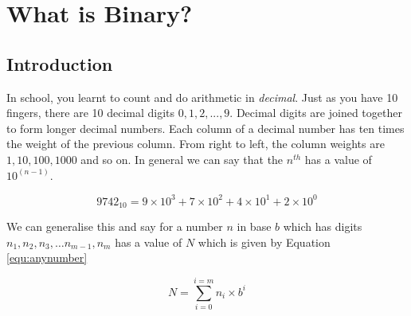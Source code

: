 \chapter{What is Binary?}
	\section{Introduction}
	In school, you learnt to count and do arithmetic in \textit{decimal}. Just as you have 10 fingers, there are 10 decimal digits $0,1,2, ..., 9$. Decimal digits are joined together to form longer decimal numbers. Each column of a decimal number has ten times the weight of the previous column. From right to left, the column weights are $1, 10, 100, 1000$ and so on. In general we can say that the $n^{th}$ has a value of $10 ^{(n - 1)}$.

	\begin{equation}
	9742_{10} = 9 \times 10^3 + 7 \times 10^2 + 4 \times 10^1 + 2 \times 10^0
	\end{equation}

	We can generalise this and say for a number $n$ in base $b$ which has digits $n_1, n_2, n_3, \dots n_{m-1}, n_m$ has a value of $N$ which is given by Equation \ref{equ:anynumber}

	\begin{equation}
		N = \sum_{i=0}^{i=m} n_i \times b^i
		\label{equ:anynumber}
	\end{equation}

